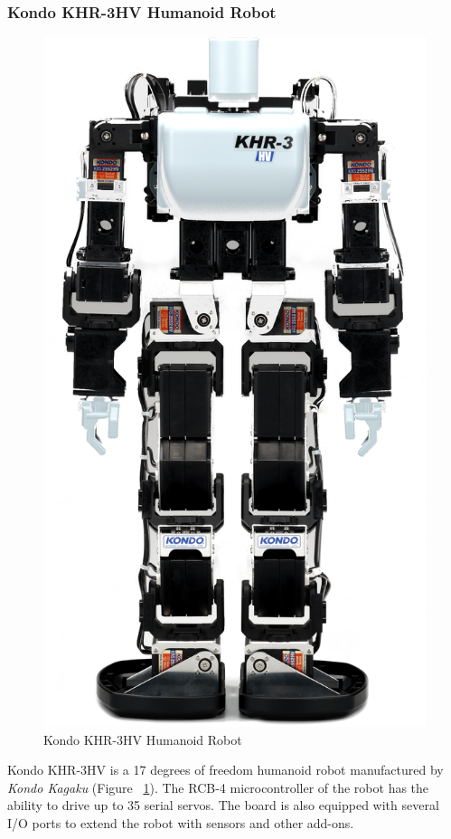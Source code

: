\documentclass[12pt]{article}
\newcommand\mysubsubsection[1]{\subsubsection{#1}}
\numberwithin{equation}{section}
\numberwithin{figure}{section}
\numberwithin{table}{section}
\begin{document}
\mysubsubsection{Kondo KHR-3HV Humanoid Robot}
\par{
    \begin{figure}[ht]
        \centering
        \includegraphics[scale=0.7]{images/kondo}
        \caption{Kondo KHR-3HV Humanoid Robot}
        \label{fig:kondo}
    \end{figure}
    Kondo KHR-3HV is a 17 degrees of freedom humanoid robot manufactured by
    \emph{Kondo Kagaku} (Figure ~\ref{fig:kondo}). The RCB-4 microcontroller of the robot has the
    ability to drive up to 35 serial servos. The board is also equipped with
    several I/O ports to extend the robot with sensors and other add-ons.
}
\end{document}
